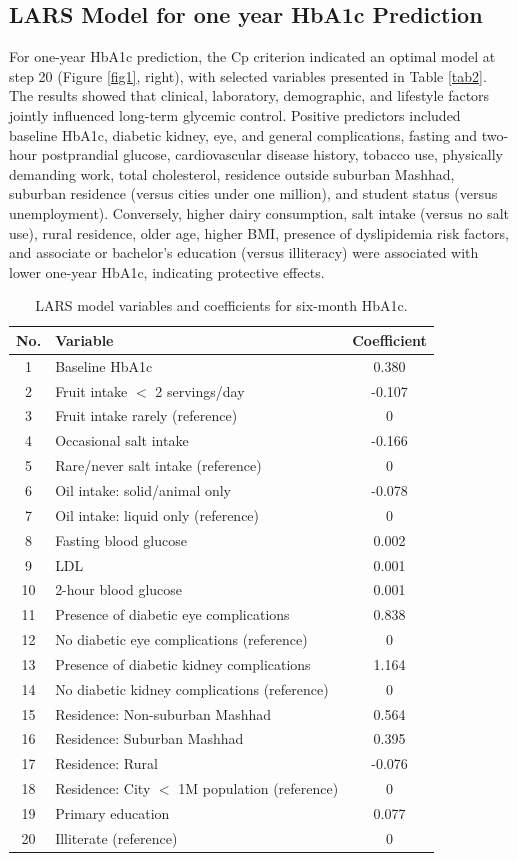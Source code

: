 \documentclass[twoside]{article}
\begin{document}
\subsection{LARS Model for one year HbA1c Prediction}
For one-year HbA1c prediction, the Cp criterion indicated an optimal model at step 20 (Figure \ref{fig1}, right), with selected variables presented in Table \ref{tab2}. The results showed that clinical, laboratory, demographic, and lifestyle factors jointly influenced long-term glycemic control. Positive predictors included baseline HbA1c, diabetic kidney, eye, and general complications, fasting and two-hour postprandial glucose, cardiovascular disease history, tobacco use, physically demanding work, total cholesterol, residence outside suburban Mashhad, suburban residence (versus cities under one million), and student status (versus unemployment). Conversely, higher dairy consumption, salt intake (versus no salt use), rural residence, older age, higher BMI, presence of dyslipidemia risk factors, and associate or bachelor's education (versus illiteracy) were associated with lower one-year HbA1c, indicating protective effects.
\begin{table}[h]
\centering
\small
\caption{LARS model variables and coefficients for six-month HbA1c.}
\vspace{1em}
\label{tab1}
\begin{tabular}{|c|l|c|}
  \hline
  No. & Variable & Coefficient \\  \hline \hline
  1 & Baseline HbA1c & 0.380 \\
  2 & Fruit intake $<$ 2 servings/day & -0.107 \\
  3 & Fruit intake rarely (reference) & 0 \\
  4 & Occasional salt intake & -0.166 \\
  5 & Rare/never salt intake (reference) & 0 \\
  6 & Oil intake: solid/animal only & -0.078 \\
  7 & Oil intake: liquid only (reference) & 0 \\
  8 & Fasting blood glucose & 0.002 \\
  9 & LDL & 0.001 \\
  10 & 2-hour blood glucose & 0.001 \\
  11 & Presence of diabetic eye complications & 0.838 \\
  12 & No diabetic eye complications (reference) & 0 \\
  13 & Presence of diabetic kidney complications & 1.164 \\
  14 & No diabetic kidney complications (reference) & 0 \\
  15 & Residence: Non-suburban Mashhad & 0.564 \\
  16 & Residence: Suburban Mashhad & 0.395 \\
  17 & Residence: Rural & -0.076 \\
  18 & Residence: City $<$ 1M population (reference) & 0 \\
  19 & Primary education & 0.077 \\
  20 & Illiterate (reference) & 0 \\  \hline
\end{tabular}
\end{table}
\end{document}
